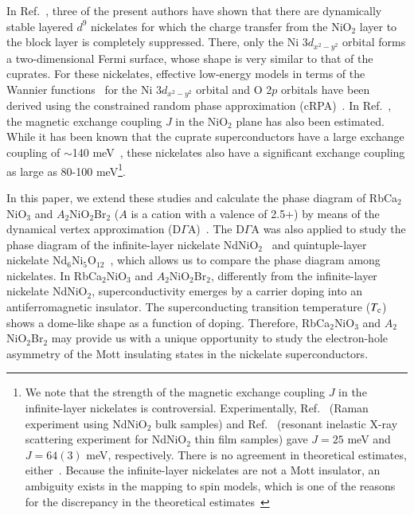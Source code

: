 \documentclass[%
 aip,
 amsmath,amssymb,
 reprint,%
]{revtex4-1}
\begin{document}
In Ref.~, three of the present authors have shown that there are dynamically stable layered $d^9$ nickelates for which the charge transfer from the NiO$_2$ layer to the block layer is completely suppressed. There, only the Ni 3$d_{x^2-y^2}$ orbital forms a two-dimensional Fermi surface, whose shape is very similar to that of the cuprates. For these nickelates, effective low-energy models in terms of the Wannier functions~\cite{Pizzi_2020} for the Ni 3$d_{x^2-y^2}$ orbital and O 2$p$ orbitals have been derived using the constrained random phase approximation (cRPA)~\cite{Aryasetiawan_2004,Nakamura_2021}. In Ref.~, the magnetic exchange coupling $J$ in the NiO$_2$ plane has also been estimated. While it has been known that the cuprate superconductors have a large exchange coupling of $\sim$140 meV~\cite{Lee_2006}, these nickelates also have a significant exchange coupling as large as 80-100 meV\footnote{
We note that the strength of the magnetic exchange coupling $J$ in the infinite-layer nickelates is controversial. 
Experimentally, Ref.~ (Raman experiment using NdNiO$_2$ bulk samples) and Ref.~ (resonant inelastic X-ray scattering experiment for NdNiO$_2$ thin film samples) gave $J=25$ meV and $J=64(3)$ meV, respectively. 
There is no agreement in theoretical estimates, either~\cite{Jiang_2020,Ryee_2020,HuZhang_2020,GM_Zhang_2020,Z_Liu_2020,Been_2021,Leonov_2020,Leonov_2021,X_Wan_2021,ZJ_Lang_2021,Katukuri_2020,R_Zhang_2021}.
Because the infinite-layer nickelates are not a Mott insulator, an ambiguity exists in the mapping to spin models, which is one of the reasons for the discrepancy in the theoretical estimates~\cite{Nomura_2020}}.

In this paper, we extend these studies and calculate the phase diagram of RbCa$_2$NiO$_3$ and $A_2$NiO$_2$Br$_2$ ($A$ is a cation with a valence of 2.5+) 
by means of the dynamical vertex approximation (D$\Gamma$A)~\cite{Toschi_2007,Katanin_2009,Rohringer_2018}. 
The D$\Gamma$A was also applied to study the phase diagram of the infinite-layer nickelate NdNiO$_2$~\cite{Kitatani_2020} and quintuple-layer nickelate Nd$_6$Ni$_5$O$_{12}$~\cite{Worm_2021}, which allows us to compare the phase diagram among nickelates. 
In RbCa$_2$NiO$_3$ and $A_2$NiO$_2$Br$_2$, differently from the infinite-layer nickelate NdNiO$_2$, superconductivity emerges by a carrier doping into an antiferromagnetic insulator. 
The superconducting transition temperature ($T_{\rm c}$) shows a dome-like shape as a function of doping. 
Therefore, RbCa$_2$NiO$_3$ and $A_2$NiO$_2$Br$_2$ may provide us with a unique opportunity to study 
the electron-hole asymmetry of the Mott insulating states 
in the nickelate superconductors.    
\end{document}
